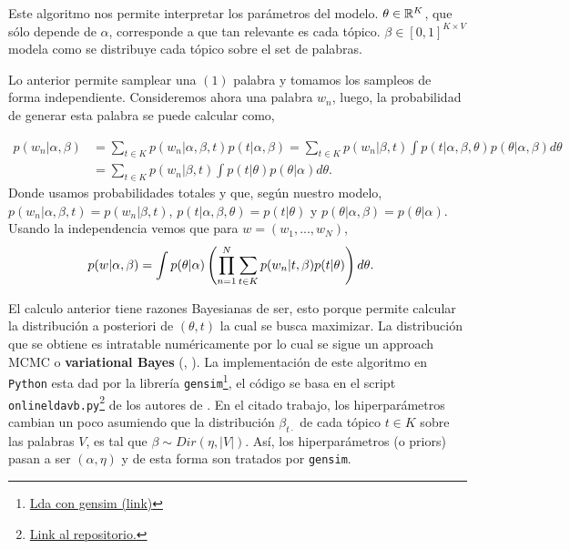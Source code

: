 \documentclass{article}
\begin{document}
	\begin{remark}
		Este algoritmo nos permite interpretar los parámetros del modelo. $\theta\in\mathbb{R}^{K}$, que sólo depende de $\alpha$, corresponde a que tan relevante es cada tópico. $\beta\in[0,1]^{K\times V}$ modela como se distribuye cada tópico sobre el set de palabras. 
	\end{remark}
	
	Lo anterior permite samplear una $(1)$ palabra y tomamos los sampleos de forma independiente. Consideremos ahora una palabra $w_n$, luego, la probabilidad de generar esta palabra se puede calcular como,
	
	\begin{align*}
		p(w_n|\alpha, \beta) &= \sum_{t\in K} p(w_n|\alpha,\beta,t)p(t|\alpha,\beta)
		= \sum_{t\in K} p(w_n|\beta,t)\int p(t|\alpha,\beta,\theta)p(\theta|\alpha,\beta)d\theta\\
		&= \sum_{t\in K} p(w_n|\beta,t)\int p(t|\theta)p(\theta|\alpha)d\theta.
	\end{align*}
	Donde usamos probabilidades totales y que, según nuestro modelo, $p(w_n|\alpha,\beta,t)=p(w_n|\beta,t)$, $p(t|\alpha,\beta,\theta)=p(t|\theta)$ y $p(\theta|\alpha,\beta)=p(\theta|\alpha)$. Usando la independencia vemos que para $w=(w_1,...,w_N)$,  
	\begin{align*}
		p(w|\alpha,\beta) &= \int p(\theta|\alpha)\left(\prod_{n=1}^N \sum_{t\in K} p(w_n|t,\beta)p(t|\theta)\right) d\theta.
	\end{align*}
	
	El calculo anterior tiene razones Bayesianas de ser, esto porque permite calcular la distribución a posteriori de $(\theta, t)$ la cual se busca maximizar. La distribución que se obtiene es intratable numéricamente por lo cual se sigue un approach MCMC o \textbf{variational Bayes}  (\cite{LDA03}, \cite{LDA10}). La implementación de este algoritmo en \texttt{Python} esta dad por la librería \texttt{gensim}\footnote{\href{https://radimrehurek.com/gensim/models/ldamodel.html}{Lda con gensim (link)}}, el código se basa en el script \texttt{onlineldavb.py}\footnote{\href{https://github.com/blei-lab/onlineldavb/blob/master/onlineldavb.py}{Link al repositorio.}} de los autores de \cite{LDA10}. En el citado trabajo, los hiperparámetros cambian un poco asumiendo que la distribución $\beta_{t\cdot}$ de cada tópico $t\in K$ sobre las palabras $V$, es tal que $\beta\sim Dir(\eta, |V|)$. Así, los hiperparámetros (o priors) pasan a ser $(\alpha,\eta)$ y de esta forma son tratados por \texttt{gensim}.\\ 
	
\end{document}
